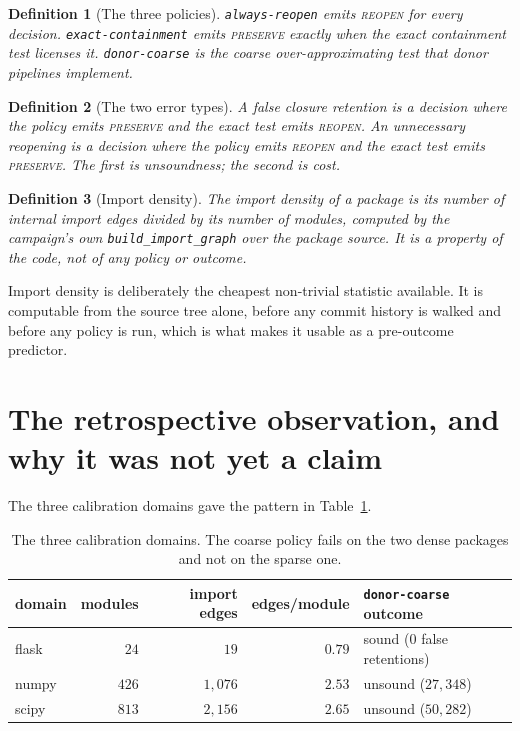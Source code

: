 \documentclass[11pt]{article}
\newtheorem{definition}{Definition}
\begin{document}
\begin{definition}[The three policies]
\texttt{always-reopen} emits \textsc{reopen} for every decision. \texttt{exact-containment} emits \textsc{preserve} exactly when the exact containment test licenses it. \texttt{donor-coarse} is the coarse over-approximating test that donor pipelines implement.
\end{definition}

\begin{definition}[The two error types]
A \emph{false closure retention} is a decision where the policy emits \textsc{preserve} and the exact test emits \textsc{reopen}. An \emph{unnecessary reopening} is a decision where the policy emits \textsc{reopen} and the exact test emits \textsc{preserve}. The first is unsoundness; the second is cost.
\end{definition}

\begin{definition}[Import density]
The \emph{import density} of a package is its number of internal import edges divided by its number of modules, computed by the campaign's own \texttt{build_import_graph} over the package source. It is a property of the code, not of any policy or outcome.
\end{definition}

Import density is deliberately the cheapest non-trivial statistic available. It is computable from the source tree alone, before any commit history is walked and before any policy is run, which is what makes it usable as a pre-outcome predictor.

\section{The retrospective observation, and why it was not yet a claim}
The three calibration domains gave the pattern in Table~\ref{tab:calib}.

\begin{table}[h]
\centering
\begin{tabular}{lrrrl}
\toprule
domain & modules & import edges & edges/module & \texttt{donor-coarse} outcome \\
\midrule
flask & $24$ & $19$ & $0.79$ & sound ($0$ false retentions) \\
numpy & $426$ & $1{,}076$ & $2.53$ & unsound ($27{,}348$) \\
scipy & $813$ & $2{,}156$ & $2.65$ & unsound ($50{,}282$) \\
\bottomrule
\end{tabular}
\caption{The three calibration domains. The coarse policy fails on the two dense packages and not on the sparse one.}
\label{tab:calib}
\end{table}
\end{document}
